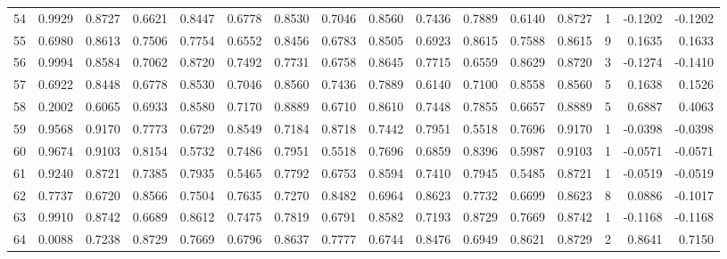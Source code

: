\begin{tabular}{lrrrrrrrrrrrrrrr}
54  &      0.9929 &  0.8727 &  0.6621 &  0.8447 &  0.6778 &  0.8530 &  0.7046 &  0.8560 &  0.7436 &  0.7889 &   0.6140 &     0.8727 &      1 &                   -0.1202 &                    -0.1202 \\
55  &      0.6980 &  0.8613 &  0.7506 &  0.7754 &  0.6552 &  0.8456 &  0.6783 &  0.8505 &  0.6923 &  0.8615 &   0.7588 &     0.8615 &      9 &                    0.1635 &                     0.1633 \\
56  &      0.9994 &  0.8584 &  0.7062 &  0.8720 &  0.7492 &  0.7731 &  0.6758 &  0.8645 &  0.7715 &  0.6559 &   0.8629 &     0.8720 &      3 &                   -0.1274 &                    -0.1410 \\
57  &      0.6922 &  0.8448 &  0.6778 &  0.8530 &  0.7046 &  0.8560 &  0.7436 &  0.7889 &  0.6140 &  0.7100 &   0.8558 &     0.8560 &      5 &                    0.1638 &                     0.1526 \\
58  &      0.2002 &  0.6065 &  0.6933 &  0.8580 &  0.7170 &  0.8889 &  0.6710 &  0.8610 &  0.7448 &  0.7855 &   0.6657 &     0.8889 &      5 &                    0.6887 &                     0.4063 \\
59  &      0.9568 &  0.9170 &  0.7773 &  0.6729 &  0.8549 &  0.7184 &  0.8718 &  0.7442 &  0.7951 &  0.5518 &   0.7696 &     0.9170 &      1 &                   -0.0398 &                    -0.0398 \\
60  &      0.9674 &  0.9103 &  0.8154 &  0.5732 &  0.7486 &  0.7951 &  0.5518 &  0.7696 &  0.6859 &  0.8396 &   0.5987 &     0.9103 &      1 &                   -0.0571 &                    -0.0571 \\
61  &      0.9240 &  0.8721 &  0.7385 &  0.7935 &  0.5465 &  0.7792 &  0.6753 &  0.8594 &  0.7410 &  0.7945 &   0.5485 &     0.8721 &      1 &                   -0.0519 &                    -0.0519 \\
62  &      0.7737 &  0.6720 &  0.8566 &  0.7504 &  0.7635 &  0.7270 &  0.8482 &  0.6964 &  0.8623 &  0.7732 &   0.6699 &     0.8623 &      8 &                    0.0886 &                    -0.1017 \\
63  &      0.9910 &  0.8742 &  0.6689 &  0.8612 &  0.7475 &  0.7819 &  0.6791 &  0.8582 &  0.7193 &  0.8729 &   0.7669 &     0.8742 &      1 &                   -0.1168 &                    -0.1168 \\
64  &      0.0088 &  0.7238 &  0.8729 &  0.7669 &  0.6796 &  0.8637 &  0.7777 &  0.6744 &  0.8476 &  0.6949 &   0.8621 &     0.8729 &      2 &                    0.8641 &                     0.7150 \\

\end{tabular}
